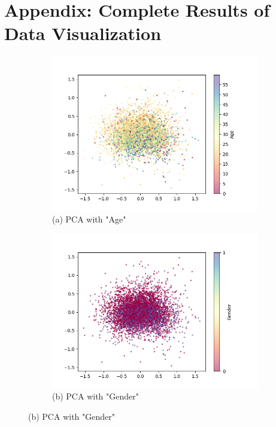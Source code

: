 \documentclass{article}
\begin{document}
\section*{Appendix: Complete Results of Data Visualization}
\begin{figure}[H]
    \centering
    \begin{subfigure}{0.49\textwidth}
        \includegraphics[width=\textwidth]{fig/pca_age.png}
        \caption*{(a) PCA with "Age"}
    \end{subfigure}
    \begin{subfigure}{0.49\textwidth}
        \includegraphics[width=\textwidth]{fig/pca_gender.png}
        \caption*{(b) PCA with "Gender"}
    \end{subfigure}
\end{figure}
\end{document}
